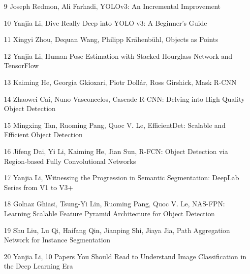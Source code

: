 \documentclass{article}
\begin{document}
	9 Joseph Redmon, Ali Farhadi, YOLOv3: An Incremental Improvement
	
	10 Yanjia Li, Dive Really Deep into YOLO v3: A Beginner’s Guide
	
	11 Xingyi Zhou, Dequan Wang, Philipp Krähenbühl, Objects as Points
	
	12 Yanjia Li, Human Pose Estimation with Stacked Hourglass Network and TensorFlow
	
	13 Kaiming He, Georgia Gkioxari, Piotr Dollár, Ross Girshick, Mask R-CNN
	
	14 Zhaowei Cai, Nuno Vasconcelos, Cascade R-CNN: Delving into High Quality Object Detection
	
	15 Mingxing Tan, Ruoming Pang, Quoc V. Le, EfficientDet: Scalable and Efficient Object Detection
	
	16 Jifeng Dai, Yi Li, Kaiming He, Jian Sun, R-FCN: Object Detection via Region-based Fully Convolutional Networks
	
	17 Yanjia Li, Witnessing the Progression in Semantic Segmentation: DeepLab Series from V1 to V3+
	
	18 Golnaz Ghiasi, Tsung-Yi Lin, Ruoming Pang, Quoc V. Le, NAS-FPN: Learning Scalable Feature Pyramid Architecture for Object Detection
	
	19 Shu Liu, Lu Qi, Haifang Qin, Jianping Shi, Jiaya Jia, Path Aggregation Network for Instance Segmentation
	
	20 Yanjia Li, 10 Papers You Should Read to Understand Image Classification in the Deep Learning Era
	
\end{document}
